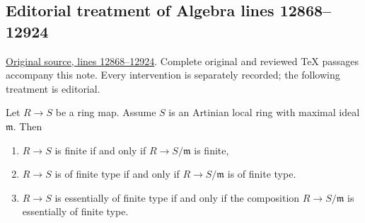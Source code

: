 \subsection{Editorial treatment of Algebra lines 12868--12924}

\hypertarget{algebra-context-173}{}

\noindent\href{https://github.com/stacks/stacks-project/blob/a04446e57ec1fbc252a871afcec7752fb2807b14/algebra.tex\#L12868}{Original source, lines 12868--12924}. Complete original and reviewed TeX passages accompany this note. Every intervention is separately recorded; the following treatment is editorial.


\begin{lemma}
\label{editorial-source-lemma-essentially-of-finite-type-into-artinian-local}
Let $R \to S$ be a ring map. Assume $S$ is an Artinian local ring with
maximal ideal $\mathfrak m$. Then
\begin{enumerate}
\item $R \to S$ is finite if and only if $R \to S/\mathfrak m$ is finite,
\item $R \to S$ is of finite type if and only if $R \to S/\mathfrak m$
is of finite type.
\item $R \to S$ is essentially of finite type if and
only if the composition $R \to S/\mathfrak m$ is essentially
of finite type.
\end{enumerate}
\end{lemma}


